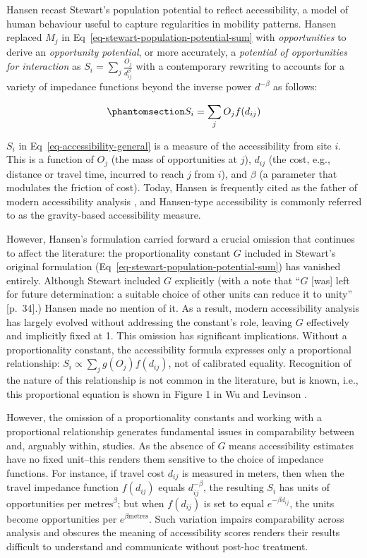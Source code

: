 \documentclass[
  10pt,
  letterpaper,
]{article}
\begin{document}
Hansen recast Stewart's population potential to reflect accessibility, a
model of human behaviour useful to capture regularities in mobility
patterns. Hansen replaced \(M_j\) in
Eq~\ref{eq-stewart-population-potential-sum} with \emph{opportunities}
to derive an \emph{opportunity potential}, or more accurately, a
\emph{potential of opportunities for interaction} as
\(S_{i} = \sum_j \frac{O_j }{d_{ij}^\beta}\) with a contemporary
rewriting to accounts for a variety of impedance functions beyond the
inverse power \(d^{-\beta}\) as follows:

\begin{equation}\phantomsection\label{eq-accessibility-general}{
S_{i} = \sum_j O_j  f(d_{ij})
}\end{equation}

\(S_{i}\) in Eq~\ref{eq-accessibility-general} is a measure of the
accessibility from site \(i\). This is a function of \(O_j\) (the mass
of opportunities at \(j\)), \(d_{ij}\) (the cost, e.g., distance or
travel time, incurred to reach \(j\) from \(i\)), and \(\beta\) (a
parameter that modulates the friction of cost). Today, Hansen is
frequently cited as the father of modern accessibility analysis
\citep[e.g.,][]{reggianiGuestEditorialNew2011}, and Hansen-type
accessibility is commonly referred to as the gravity-based accessibility
measure.

However, Hansen's formulation carried forward a crucial omission that
continues to affect the literature: the proportionality constant \(G\)
included in Stewart's original formulation
(Eq~\ref{eq-stewart-population-potential-sum}) has vanished entirely.
Although Stewart included \(G\) explicitly (with a note that ``\(G\)
{[}was{]} left for future determination: a suitable choice of other
units can reduce it to unity'' {[}p.~34{]}.) Hansen made no mention of
it. As a result, modern accessibility analysis has largely evolved
without addressing the constant's role, leaving \(G\) effectively and
implicitly fixed at 1. This omission has significant implications.
Without a proportionality constant, the accessibility formula expresses
only a proportional relationship:
\(S_i \propto \sum_j g(O_j)f(d_{ij})\), not of calibrated equality.
Recognition of the nature of this relationship is not common in the
literature, but is known, i.e., this proportional equation is shown in
Figure 1 in Wu and Levinson \citep{wuUnifyingAccess2020}.

However, the omission of a proportionality constants and working with a
proportional relationship generates fundamental issues in comparability
between and, arguably within, studies. As the absence of \(G\) means
accessibility estimates have no fixed unit--this renders them sensitive
to the choice of impedance functions. For instance, if travel cost
\(d_{ij}\) is measured in meters, then when the travel impedance
function \(f(d_{ij})\) equals \(d_{ij}^{-\beta}\), the resulting \(S_i\)
has units of opportunities per \(\text{metres}^{\beta}\); but when
\(f(d_{ij})\) is set to equal \(e^{-\beta d_{ij}}\), the units become
opportunities per \(e^{\beta \text{metres}}\). Such variation impairs
comparability across analysis and obscures the meaning of accessibility
scores renders their results difficult to understand and communicate
without post-hoc treatment.
\end{document}
